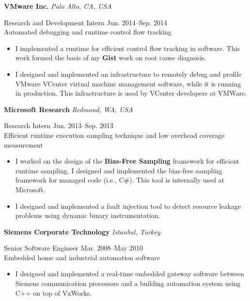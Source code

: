 \documentclass[10pt]{article}
\newcommand{\mysub}[3]{\textbf{#1} {#2} \hfill {\em #3}}
\newcommand{\myssub}[1]{\hspace*{2mm}\parbox{163mm}{#1}\vspace*{2mm}}
\begin{document}
\newpage

\mysub{VMware Inc.}{}{Palo Alto, CA, USA} \\
\myssub{\vspace{1mm}Research and Development Intern \hfill Jun. 2014--Sep. 2014\\
Automated debugging and runtime control flow tracking
\vspace{-1mm}
\begin{itemize}
\setlength\itemsep{0em}
\item{I implemented a runtime for efficient control flow tracking in software. This work formed the basis of my \textbf{Gist} work on root cause diagnosis.}
\item{I designed and implemented an infrastructure to remotely debug and profile VMware VCenter virtual machine management software, while it is running in production. This infrastructure is used by VCenter developers at VMWare.}
\end{itemize}
\vspace{-2mm}
}



\mysub{Microsoft Research}{}{Redmond, WA, USA} \\
\myssub{\vspace{1mm}Research Intern \hfill Jun. 2013--Sep. 2013\\
Efficient runtime execution sampling technique and low overhead coverage measurement
\vspace{-1mm}
\begin{itemize}
\setlength\itemsep{0em}
\item{I worked on the design of the \textbf{Bias-Free Sampling} framework for efficient runtime sampling. I designed and implemented the bias-free sampling framework for managed code (i.e., C\#). This tool is internally used at Microsoft.}
\item{I designed and implemented a fault injection tool to detect resource leakage problems using dynamic binary instrumentation. }
\end{itemize}
\vspace{-2mm}
}


\mysub{Siemens Corporate Technology}{}{Istanbul, Turkey} \\
\myssub{\vspace{1mm}Senior Software Engineer \hfill Mar. 2008--May 2010 \\
Embedded home and industrial automation software
\vspace{-1mm}
\begin{itemize}
\setlength\itemsep{0em}
\item{I designed and implemented a real-time embedded gateway software between Siemens communication processors and a building automation system using C++ on top of VxWorks.}
\end{itemize}
}
\end{document}
